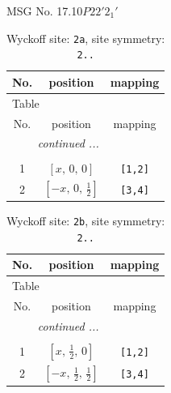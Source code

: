 \documentclass[fleqn,8pt]{jsarticle}
\begin{document}
\setcounter{MaxMatrixCols}{32}

\renewcommand{\tablename}{Table~}
\renewcommand{\figurename}{Figure~}
\begin{center}
\LARGE
MSG No. 17.10\quad$P22'2_{1}'$
\end{center}
\renewcommand{\arraystretch}{1.2}
\begin{longtable}{ccc}
\caption{Wyckoff site: {\tt 2a}, site symmetry: {\tt 2..}}
 \\
 \hline \hline
No. & position & mapping \\ \hline \endfirsthead

\multicolumn{2}{l}{\tablename\ \thetable{}} \\
 \hline \hline
No. & position & mapping \\ \hline \endhead

 \hline \hline
\multicolumn{2}{r}{\footnotesize\it continued ...} \\ \endfoot

 \hline \hline
\multicolumn{2}{r}{} \\ \endlastfoot

1 & $\left[ x,\, 0,\, 0 \right]$ & {\tt [1,2]} \\ \hline
2 & $\left[ - x,\, 0,\, \frac{1}{2} \right]$ & {\tt [3,4]} \\
\end{longtable}
\renewcommand{\arraystretch}{1.2}
\begin{longtable}{ccc}
\caption{Wyckoff site: {\tt 2b}, site symmetry: {\tt 2..}}
 \\
 \hline \hline
No. & position & mapping \\ \hline \endfirsthead

\multicolumn{2}{l}{\tablename\ \thetable{}} \\
 \hline \hline
No. & position & mapping \\ \hline \endhead

 \hline \hline
\multicolumn{2}{r}{\footnotesize\it continued ...} \\ \endfoot

 \hline \hline
\multicolumn{2}{r}{} \\ \endlastfoot

1 & $\left[ x,\, \frac{1}{2},\, 0 \right]$ & {\tt [1,2]} \\ \hline
2 & $\left[ - x,\, \frac{1}{2},\, \frac{1}{2} \right]$ & {\tt [3,4]} \\
\end{longtable}
\renewcommand{\arraystretch}{1.2}
\end{document}
